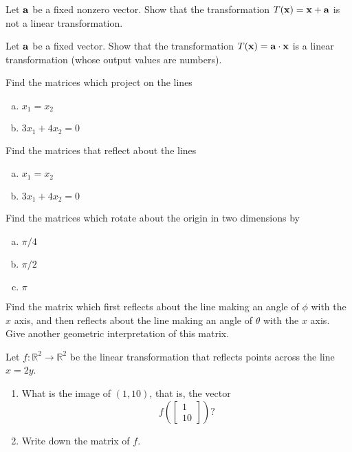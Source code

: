\begin{problem}
\label{op3_5}
Let $\aa$ be a fixed nonzero vector. Show that the transformation $T(\xx)=\xx+\aa$
is not a linear transformation.
\end{problem}

\begin{problem}
\label{op3_6}
Let $\aa$ be a fixed vector. Show that the transformation $T(\xx)=\aa\cdot\xx$
is a linear transformation (whose output values are numbers).
\end{problem}

\begin{problem}
\label{op3_7}
Find the matrices which project on the lines
\begin{enumerate}[(a)]
\item $x_1=x_2$ 
\item $3x_1+4x_2=0$
\end{enumerate}
\end{problem}

\begin{problem}
\label{op3_8}
Find the matrices that reflect about the lines
\begin{enumerate}[(a)]
\item $x_1=x_2$ 
\item $3x_1+4x_2=0$
\end{enumerate}
\end{problem}

\begin{problem}
\label{op3_9}
Find the matrices which rotate about the origin in two dimensions by
\begin{enumerate}[(a)]
\item $\pi/4$
\item $\pi/2$ 
\item $\pi$
\end{enumerate}
\end{problem}

\begin{problem}
\label{op3_11}
Find the matrix which first reflects about the line making an angle of $\phi$
with the $x$ axis, and then reflects about the line making an angle of $\theta$
with the $x$ axis. Give another geometric interpretation of this matrix.
\end{problem}

\begin{problem}
\label{2009_a7_2}
Let $f:\mathbb{R}^2\to \mathbb{R}^2$ be the linear transformation  that  reflects points across the line $x=2y$.
    \begin{enumerate}
        \item What is the image of $(1,10)$, that is, the vector
\[
f \left(\left[ \begin{array}{c}
1 \\ 10
\end{array} \right]\right)?
\]
        \item Write down the matrix of $f$.\\
    \end{enumerate}
\end{problem}

